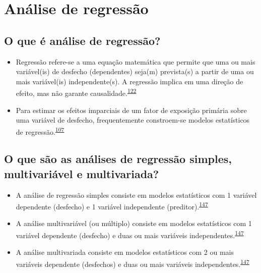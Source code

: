 \documentclass[
  a4paper,
]{book}
\begin{document}
\hypertarget{analise-regressao}{%
\section{Análise de regressão}\label{analise-regressao}}

\hypertarget{o-que-uxe9-anuxe1lise-de-regressuxe3o}{%
\subsection{O que é análise de regressão?}\label{o-que-uxe9-anuxe1lise-de-regressuxe3o}}

\begin{itemize}
\item
  Regressão refere-se a uma equação matemática que permite que uma ou mais variável(is) de desfecho (dependentes) seja(m) prevista(s) a partir de uma ou mais variável(is) independente(s). A regressão implica em uma direção de efeito, mas não garante causalidade.\textsuperscript{\protect\hyperlink{ref-greenhalgh1997a}{122}}
\item
  Para estimar os efeitos imparciais de um fator de exposição primária sobre uma variável de desfecho, frequentemente constroem-se modelos estatísticos de regressão.\textsuperscript{\protect\hyperlink{ref-bandoli2018}{107}}
\end{itemize}

\hypertarget{o-que-suxe3o-as-anuxe1lises-de-regressuxe3o-simples-multivariuxe1vel-e-multivariada}{%
\subsection{O que são as análises de regressão simples, multivariável e multivariada?}\label{o-que-suxe3o-as-anuxe1lises-de-regressuxe3o-simples-multivariuxe1vel-e-multivariada}}

\begin{itemize}
\item
  A análise de regressão simples consiste em modelos estatísticos com 1 variável dependente (desfecho) e 1 variável independente (preditor).\textsuperscript{\protect\hyperlink{ref-Hidalgo2013}{147}}
\item
  A análise multivariável (ou múltiplo) consiste em modelos estatísticos com 1 variável dependente (desfecho) e duas ou mais variáveis independentes.\textsuperscript{\protect\hyperlink{ref-Hidalgo2013}{147}}
\item
  A análise multivariada consiste em modelos estatísticos com 2 ou mais variáveis dependente (desfechos) e duas ou mais variáveis independentes.\textsuperscript{\protect\hyperlink{ref-Hidalgo2013}{147}}
\end{itemize}
\end{document}
